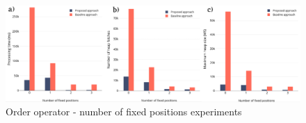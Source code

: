 \begin{figure}[H]
	\includegraphics[scale=0.25]{images/order.png}
	\centering
	\caption{Order operator - number of fixed positions experiments}
	\label{fig:order}
\end{figure}